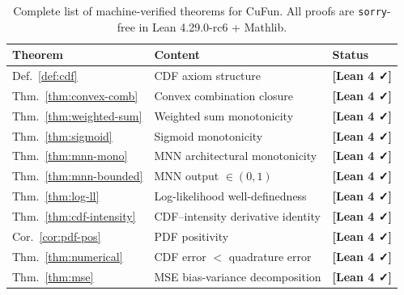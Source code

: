 \documentclass[11pt]{article}
\newcommand{\verified}{%
  \textcolor{green!60!black}{\textbf{[Lean 4 ✓]}}%
}
\begin{document}
\begin{table}[h!]
\centering
\renewcommand{\arraystretch}{1.3}
\begin{tabular}{lll}
\hline
\textbf{Theorem} & \textbf{Content} & \textbf{Status} \\
\hline
Def.~\ref{def:cdf} & CDF axiom structure & \verified{} \\
Thm.~\ref{thm:convex-comb} & Convex combination closure & \verified{} \\
Thm.~\ref{thm:weighted-sum} & Weighted sum monotonicity & \verified{} \\
Thm.~\ref{thm:sigmoid} & Sigmoid monotonicity & \verified{} \\
Thm.~\ref{thm:mnn-mono} & MNN architectural monotonicity & \verified{} \\
Thm.~\ref{thm:mnn-bounded} & MNN output $\in (0,1)$ & \verified{} \\
Thm.~\ref{thm:log-ll} & Log-likelihood well-definedness & \verified{} \\
Thm.~\ref{thm:cdf-intensity} & CDF–intensity derivative identity & \verified{} \\
Cor.~\ref{cor:pdf-pos} & PDF positivity & \verified{} \\
Thm.~\ref{thm:numerical} & CDF error $<$ quadrature error & \verified{} \\
Thm.~\ref{thm:mse} & MSE bias-variance decomposition & \verified{} \\
\hline
\end{tabular}
\caption{Complete list of machine-verified theorems for CuFun.
All proofs are \texttt{sorry}-free in Lean 4.29.0-rc6 + Mathlib.}
\end{table}
\end{document}
